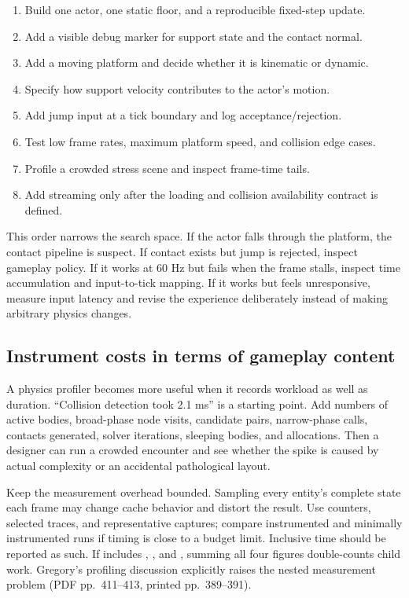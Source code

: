 \begin{enumerate}
\def\labelenumi{\arabic{enumi}.}
\tightlist
\item
  Build one actor, one static floor, and a reproducible fixed-step update.
\item
  Add a visible debug marker for support state and the contact normal.
\item
  Add a moving platform and decide whether it is kinematic or dynamic.
\item
  Specify how support velocity contributes to the actor's motion.
\item
  Add jump input at a tick boundary and log acceptance/rejection.
\item
  Test low frame rates, maximum platform speed, and collision edge cases.
\item
  Profile a crowded stress scene and inspect frame-time tails.
\item
  Add streaming only after the loading and collision availability contract is defined.
\end{enumerate}

This order narrows the search space. If the actor falls through the platform, the contact pipeline is suspect. If contact exists but jump is rejected, inspect gameplay policy. If it works at 60 Hz but fails when the frame stalls, inspect time accumulation and input-to-tick mapping. If it works but feels unresponsive, measure input latency and revise the experience deliberately instead of making arbitrary physics changes.

\subsection{Instrument costs in terms of gameplay content}\label{06-engine-ii-ch041-instrument-costs-in-terms-of-gameplay-content}

\hypertarget{06-engine-ii-ch041-instrument-costs-in-terms-of-gameplay-content}{}

A physics profiler becomes more useful when it records workload as well as duration. ``Collision detection took 2.1 ms'' is a starting point. Add numbers of active bodies, broad-phase node visits, candidate pairs, narrow-phase calls, contacts generated, solver iterations, sleeping bodies, and allocations. Then a designer can run a crowded encounter and see whether the spike is caused by actual complexity or an accidental pathological layout.

Keep the measurement overhead bounded. Sampling every entity's complete state each frame may change cache behavior and distort the result. Use counters, selected traces, and representative captures; compare instrumented and minimally instrumented runs if timing is close to a budget limit. Inclusive time should be reported as such. If  includes , , and , summing all four figures double-counts child work. Gregory's profiling discussion explicitly raises the nested measurement problem (PDF pp.~411--413, printed pp.~389--391).

